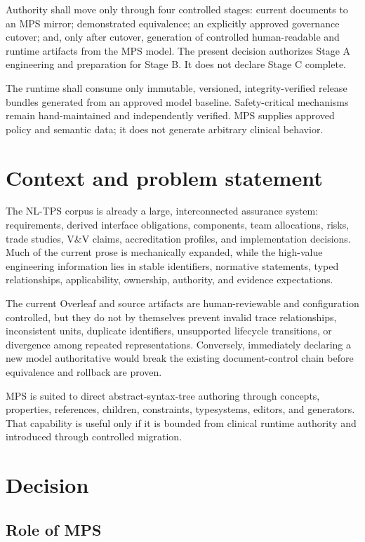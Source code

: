 \documentclass[11pt,letterpaper]{article}
\begin{document}
Authority shall move only through four controlled stages: current documents to an MPS mirror; demonstrated equivalence; an explicitly approved governance cutover; and, only after cutover, generation of controlled human-readable and runtime artifacts from the MPS model. The present decision authorizes Stage A engineering and preparation for Stage B. It does not declare Stage C complete.

The runtime shall consume only immutable, versioned, integrity-verified release bundles generated from an approved model baseline. Safety-critical mechanisms remain hand-maintained and independently verified. MPS supplies approved policy and semantic data; it does not generate arbitrary clinical behavior.

\section{Context and problem statement}

The NL-TPS corpus is already a large, interconnected assurance system: requirements, derived interface obligations, components, team allocations, risks, trade studies, V\&V claims, accreditation profiles, and implementation decisions. Much of the current prose is mechanically expanded, while the high-value engineering information lies in stable identifiers, normative statements, typed relationships, applicability, ownership, authority, and evidence expectations.

The current Overleaf and source artifacts are human-reviewable and configuration controlled, but they do not by themselves prevent invalid trace relationships, inconsistent units, duplicate identifiers, unsupported lifecycle transitions, or divergence among repeated representations. Conversely, immediately declaring a new model authoritative would break the existing document-control chain before equivalence and rollback are proven.

MPS is suited to direct abstract-syntax-tree authoring through concepts, properties, references, children, constraints, typesystems, editors, and generators. That capability is useful only if it is bounded from clinical runtime authority and introduced through controlled migration.

\section{Decision}

\subsection{Role of MPS}
\end{document}
